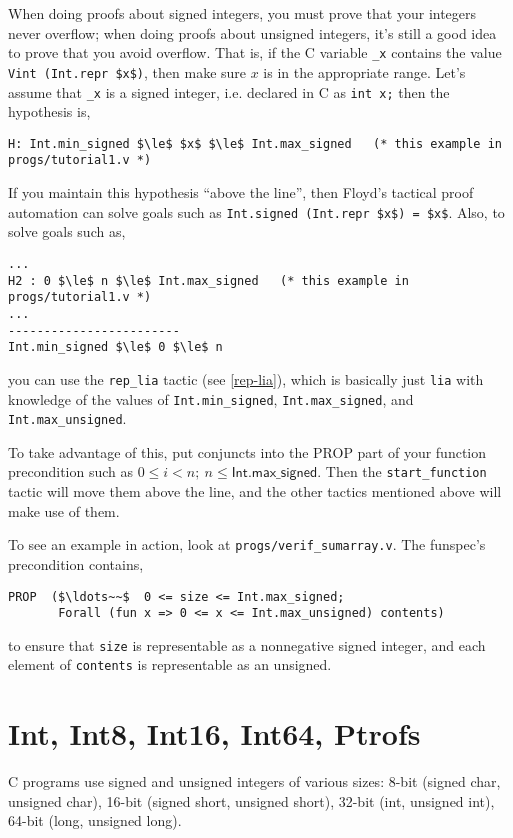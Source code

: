 \documentclass[12pt,fleqn,openany,oneside,showtrims]{memoir}
\begin{document}
When doing proofs about signed integers,
you must prove that your integers never overflow;
when doing proofs about unsigned integers,
it's still a good idea to prove that you avoid
overflow.  That is,
if the C variable \lstinline{_x} contains the value
\lstinline{Vint (Int.repr $x$)}, then make sure $x$ is in
the appropriate range.  Let's assume that \lstinline{_x}
is a signed integer, i.e. declared in C as \lstinline{int x;}
then the hypothesis is,
\begin{lstlisting}
H: Int.min_signed $\le$ $x$ $\le$ Int.max_signed   (* this example in progs/tutorial1.v *)
\end{lstlisting}
If you maintain this hypothesis ``above the line'',
then Floyd's tactical proof automation
can solve goals such as
\lstinline{Int.signed (Int.repr $x$) = $x$}.
Also, to solve goals such as,
\begin{lstlisting}
...
H2 : 0 $\le$ n $\le$ Int.max_signed   (* this example in progs/tutorial1.v *)
...
------------------------
Int.min_signed $\le$ 0 $\le$ n
\end{lstlisting}
you can use the \lstinline{rep_lia} tactic (see \autoref{rep-lia}),
which is basically just \lstinline{lia} with
knowledge of the values of
\lstinline{Int.min_signed},
\lstinline{Int.max_signed},
and \lstinline{Int.max_unsigned}.

To take advantage of this, put
conjuncts into the PROP part of your function precondition
such as $0\le i < n; ~n \le \mathsf{Int.max\_signed}$.
Then the \lstinline{start_function} tactic will move them
above the line, and the other tactics mentioned
above will make use of them.

To see an example in action, look
at \lstinline{progs/verif_sumarray.v}.
The funspec's precondition contains,
\begin{lstlisting}
PROP  ($\ldots~~$  0 <= size <= Int.max_signed;
       Forall (fun x => 0 <= x <= Int.max_unsigned) contents)
\end{lstlisting}
\vspace{-\baselineskip}
to ensure that \lstinline{size} is representable
as a nonnegative signed integer,
and each element of \lstinline{contents}
is representable as an unsigned.

\chapter{Int, Int8, Int16, Int64, Ptrofs}

C programs use signed and unsigned integers of various sizes:
8-bit (signed char, unsigned char), 16-bit (signed short, unsigned short),
32-bit (int, unsigned int), 64-bit (long, unsigned long).
\end{document}
